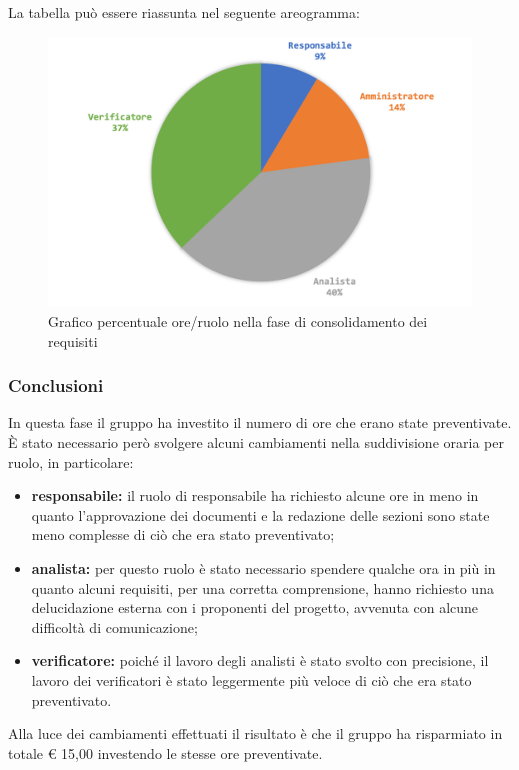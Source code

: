 			La tabella può essere riassunta nel seguente areogramma:
			\begin{figure}[H]
				\centering
				\includegraphics[width=0.8\linewidth]{images/consuntivo/ConsReqCons2.png}
				\caption{Grafico percentuale ore/ruolo nella fase di consolidamento dei requisiti}
				\label{fig:consuntivo grafico costi ruolo fase di consolidamento dei requisiti}
			\end{figure}
		
		\pagebreak
		
		\subsubsection{Conclusioni }
			In questa fase il gruppo ha investito il numero di ore che erano state preventivate. È stato necessario però svolgere alcuni cambiamenti nella suddivisione oraria per ruolo, in particolare:
			\begin{itemize}
				\item \textbf{responsabile:} il ruolo di responsabile ha richiesto alcune ore in meno in quanto l'approvazione dei documenti e la redazione delle sezioni sono state meno complesse di ciò che era stato preventivato;
				\item \textbf{analista:} per questo ruolo è stato necessario spendere qualche ora in più in quanto alcuni requisiti, per una corretta comprensione, hanno richiesto una delucidazione esterna con i proponenti del progetto, avvenuta con alcune difficoltà di comunicazione;
				\item \textbf{verificatore:} poiché il lavoro degli analisti è stato svolto con precisione, il lavoro dei verificatori è stato leggermente più veloce di ciò che era stato preventivato.
			\end{itemize}
			Alla luce dei cambiamenti effettuati il risultato è che il gruppo ha risparmiato in totale € 15,00 investendo le stesse ore preventivate.
